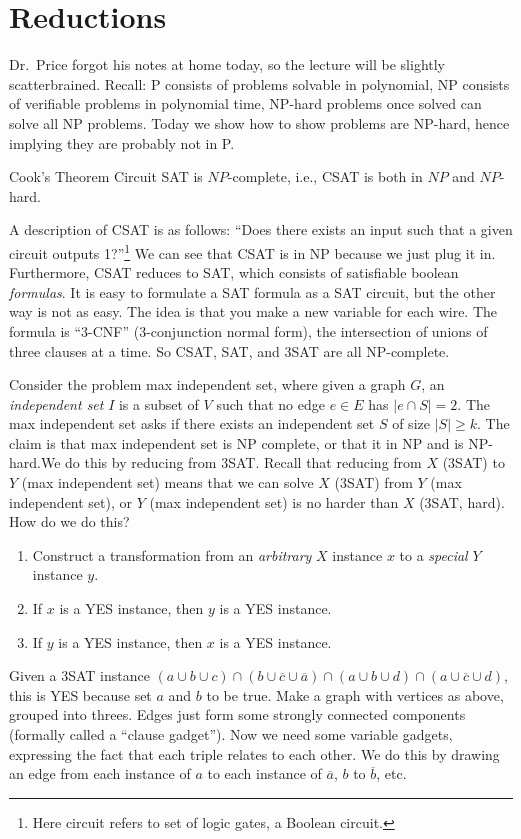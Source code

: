 \section{Reductions} 
Dr.\ Price forgot his notes at home today, so the lecture will be slightly scatterbrained. Recall:  P consists of problems solvable in polynomial, NP consists of verifiable problems in polynomial time, NP-hard problems once solved can solve all NP problems. Today we show how to show problems are NP-hard, hence implying they are probably not in P.
\begin{namedthm}{Cook's Theorem} 
   Circuit SAT is $NP$-complete, i.e., CSAT is both in $NP$ and $NP$-hard.
\end{namedthm}
A description of CSAT is as follows: ``Does there exists an input such that a given circuit outputs 1?''\footnote{Here circuit refers to set of logic gates, a Boolean circuit.} We can see that CSAT is in NP because we just plug it in. Furthermore, CSAT reduces to SAT, which consists of satisfiable boolean \emph{formulas}. It is easy to formulate a SAT formula as a SAT circuit, but the other way is not as easy. The idea is that you make a new variable for each wire. The formula is ``3-CNF'' (3-conjunction normal form), the intersection of unions of three clauses at a time. So CSAT, SAT, and 3SAT are all NP-complete.

Consider the problem max independent set, where given a graph $G$, an \emph{independent set} $I$ is a subset of $V$ such that no edge $e \in E$ has $|e \cap S|=2$. The max independent set asks if there exists an independent set $S$ of size $|S| \geq k$. The claim is that max independent set is NP complete, or that it in NP and is NP-hard.We do this by reducing from 3SAT. Recall that reducing from $X$ (3SAT) to $Y$ (max independent set) means that we can solve $X$ (3SAT) from $Y$ (max independent set), or $Y$ (max independent set) is no harder than $X$ (3SAT, hard). How do we do this?
\begin{enumerate}[label=(\arabic*)]
\setlength\itemsep{-.2em}
    \item Construct a transformation from an \emph{arbitrary} $X$ instance $x$ to a \emph{special} $Y$ instance $y$.
    \item If $x$ is a YES instance, then $y$ is a YES instance.
    \item If $y$ is a YES instance, then $x$ is a YES instance.
\end{enumerate}
Given a 3SAT instance $(a \cup b \cup c) \cap (b \cup  \overline{c}\cup  \overline{a})\cap (a \cup  b \cup  d) \cap (a \cup  \overline{c}\cup d)$, this is YES because set $a$ and $b$ to be true. Make a graph with vertices as above, grouped into threes. Edges just form some  strongly connected components (formally called a ``clause gadget''). Now we need some variable gadgets, expressing the fact that each triple relates to each other. We do this by drawing an edge from each instance of $a$ to each instance of $\overline{a}$, $b$ to $\overline{b}$, etc.

